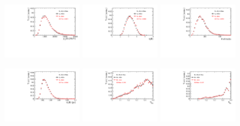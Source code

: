 \begin{figure}[h]
\centering
\includegraphics[height=!,width=0.3\textwidth]{figs/dataVsMC/finalState_norm/Ds2all_Bs_PT.pdf}
\includegraphics[height=!,width=0.3\textwidth]{figs/dataVsMC/finalState_norm/Ds2all_Bs_ETA.pdf}
\includegraphics[height=!,width=0.3\textwidth]{figs/dataVsMC/finalState_norm/Ds2all_NTracks.pdf}


\includegraphics[height=!,width=0.3\textwidth]{figs/dataVsMC/finalState_norm/Ds2all_Bs_BsDTF_TAUERR.pdf}
\includegraphics[height=!,width=0.3\textwidth]{figs/dataVsMC/finalState_norm/Ds2all_OS_Combination_PROB.pdf}
\includegraphics[height=!,width=0.3\textwidth]{figs/dataVsMC/finalState_norm/Ds2all_SS_Kaon_PROB.pdf}


\end{figure}
